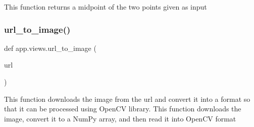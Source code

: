 \begin{DoxyVerb}This function returns a midpoint of the two points given as input
\end{DoxyVerb}
 \mbox{\label{namespaceapp_1_1views_a3972d50362fcf36689652962e5e49667}} 
\subsubsection{\texorpdfstring{url\+\_\+to\+\_\+image()}{url\_to\_image()}}
{\footnotesize\ttfamily def app.\+views.\+url\+\_\+to\+\_\+image (\begin{DoxyParamCaption}\item[{}]{url }\end{DoxyParamCaption})}

\begin{DoxyVerb}This function downloads the image from the url and convert it into a format 
so that it can be processed using OpenCV library. 
This function downloads the image, convert it to a NumPy array, and then read
it into OpenCV format
\end{DoxyVerb}
 